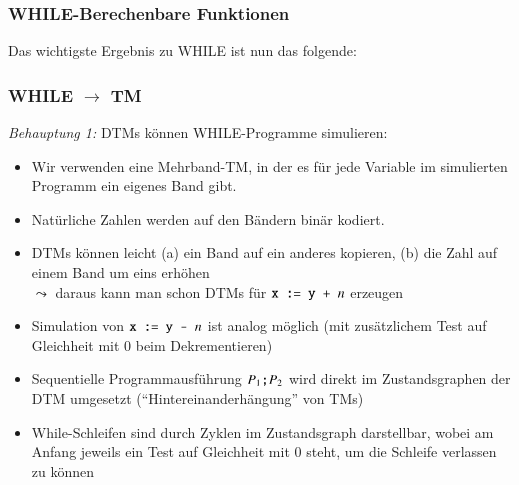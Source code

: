 \documentclass[onlymath]{beamer}
\begin{document}
\begin{frame}\frametitle{WHILE-Berechenbare Funktionen}

\bigskip\pause

Das wichtigste Ergebnis zu WHILE ist nun das folgende:


\end{frame}

\begin{frame}\frametitle{WHILE $\to$ TM}

\emph{Behauptung 1:} DTMs können WHILE-Programme simulieren:\pause
\medskip

\begin{itemize}
\item Wir verwenden eine Mehrband-TM, in der es für jede Variable im simulierten Programm ein eigenes Band gibt.\pause
\item Natürliche Zahlen werden auf den Bändern binär kodiert.\pause
\item DTMs können leicht (a) ein Band auf ein anderes kopieren, (b) die Zahl auf einem Band um eins erhöhen \\$\leadsto$ daraus kann man schon DTMs für $\texttt{x}\texttt{ := }\texttt{y}\texttt{ + } n$ erzeugen\pause
\item Simulation von $\texttt{x}\texttt{ := }\texttt{y}\texttt{ - } n$ ist analog möglich (mit zusätzlichem Test auf Gleichheit mit $0$ beim Dekrementieren)\pause
\item Sequentielle Programmausführung $P_1\texttt{;} P_2$ wird direkt im Zustandsgraphen der DTM umgesetzt ("`Hintereinanderhängung"' von TMs)\pause
\item While-Schleifen sind durch Zyklen im Zustandsgraph darstellbar, wobei am Anfang jeweils ein Test auf Gleichheit mit $0$ steht, um die Schleife verlassen zu können
\end{itemize}


\end{frame}
\end{document}
